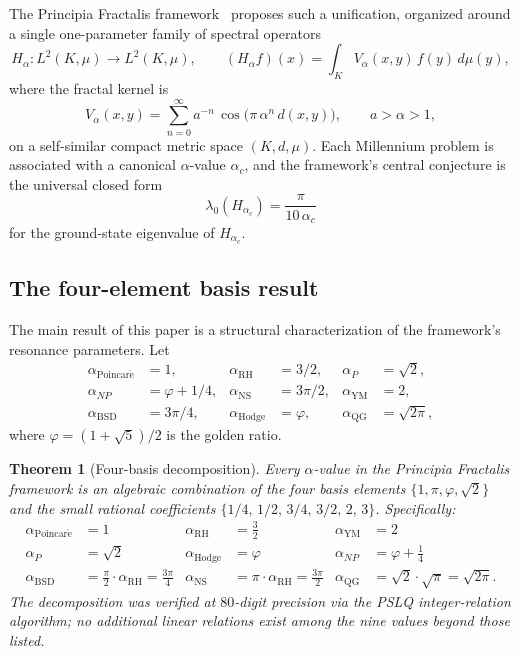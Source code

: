 \documentclass[11pt,a4paper]{article}
\newtheorem{theorem}{Theorem}[section]
\theoremstyle{definition}
\theoremstyle{remark}
\begin{document}
The Principia Fractalis framework~\cite{cohen2025framework} proposes
such a unification, organized around a single one-parameter family of
spectral operators
\[
H_\alpha \colon L^2(K, \mu) \to L^2(K, \mu),
\qquad
(H_\alpha f)(x) = \int_K V_\alpha(x,y)\,f(y)\,d\mu(y),
\]
where the fractal kernel is
\[
V_\alpha(x,y) = \sum_{n=0}^{\infty} a^{-n}\,\cos\bigl(\pi\,\alpha^n\,d(x,y)\bigr),
\qquad a > \alpha > 1,
\]
on a self-similar compact metric space $(K, d, \mu)$. Each Millennium
problem is associated with a canonical $\alpha$-value
$\alpha_c$, and the framework's central conjecture is the universal
closed form
\[
\lambda_0(H_{\alpha_c}) = \frac{\pi}{10\,\alpha_c}
\]
for the ground-state eigenvalue of $H_{\alpha_c}$.

\subsection{The four-element basis result}

The main result of this paper is a structural characterization of
the framework's resonance parameters. Let
\begin{align*}
\alpha_{\mathrm{Poincar\acute{e}}} &= 1,
& \alpha_{\mathrm{RH}} &= 3/2,
& \alpha_P &= \sqrt{2}, \\
\alpha_{NP} &= \varphi + 1/4,
& \alpha_{\mathrm{NS}} &= 3\pi/2,
& \alpha_{\mathrm{YM}} &= 2, \\
\alpha_{\mathrm{BSD}} &= 3\pi/4,
& \alpha_{\mathrm{Hodge}} &= \varphi,
& \alpha_{\mathrm{QG}} &= \sqrt{2\pi},
\end{align*}
where $\varphi = (1+\sqrt{5})/2$ is the golden ratio.

\begin{theorem}[Four-basis decomposition]\label{thm:four-basis}
Every $\alpha$-value in the Principia Fractalis framework is an
algebraic combination of the four basis elements $\{1, \pi, \varphi,
\sqrt{2}\}$ and the small rational coefficients $\{1/4,\,1/2,\,3/4,\,
3/2,\,2,\,3\}$. Specifically:
\begin{align*}
\alpha_{\mathrm{Poincar\acute{e}}} &= 1
& \alpha_{\mathrm{RH}} &= \tfrac{3}{2}
& \alpha_{\mathrm{YM}} &= 2 \\
\alpha_P &= \sqrt{2}
& \alpha_{\mathrm{Hodge}} &= \varphi
& \alpha_{NP} &= \varphi + \tfrac{1}{4} \\
\alpha_{\mathrm{BSD}} &= \tfrac{\pi}{2}\cdot \alpha_{\mathrm{RH}} = \tfrac{3\pi}{4}
& \alpha_{\mathrm{NS}} &= \pi\cdot\alpha_{\mathrm{RH}} = \tfrac{3\pi}{2}
& \alpha_{\mathrm{QG}} &= \sqrt{2}\cdot\sqrt{\pi} = \sqrt{2\pi}.
\end{align*}
The decomposition was verified at $80$-digit precision via the PSLQ
integer-relation algorithm; no additional linear relations exist among
the nine values beyond those listed.
\end{theorem}
\end{document}
